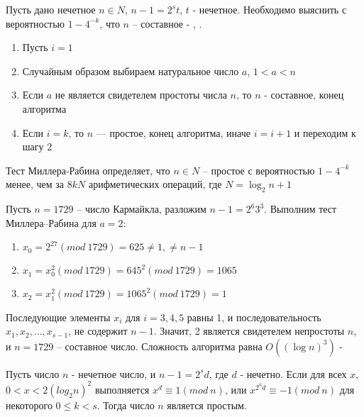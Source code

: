 Пусть дано нечетное {$n \in N$}, {$n - 1 = 2^{ s} t$}, {$t$} - нечетное. Необходимо выяснить 
с вероятностью {$1 - 4^{ -k}$}, что {$n$} – составное - \cite[Глава 1.10, страницы 27-29]{ish11},
\cite[Глава 5.1.3, страницы 183-192]{mah06}.
  
  \begin{enumerate}
   \item Пусть {$i = 1$}
   \item Случайным образом выбираем натуральное число {$a$}, {$1 < a < n$}
   \item Если {$a$} не является свидетелем простоты числа {$n$}, то {$n$} - составное, конец алгоритма
   \item Если {$i = k$}, то {$n$} — простое, конец алгоритма, иначе {$i = i + 1$} и переходим к шагу 2
  \end{enumerate}

  \begin{statement}
      Тест Миллера-Рабина определяет, что {$n \in N$} – простое с вероятностью
    {$1 - 4^{ -k}$} менее, чем за {$ 8kN $} арифметических операций, где {$N = \log_{2}{n} + 1 $}
    
  \end{statement}

  \begin{example}    
  
      Пусть {$n = 1729$} – число Кармайкла, разложим {$n - 1 = 2^{ 6} 3^{ 3}$}. 
    Выполним тест Миллера–Рабина для {$a = 2$}:
    
    \begin{enumerate}
      \item {$x_{0} = 2^{ 27} (mod \: 1729) = 625 \ne 1, \ne n - 1$}
      \item {$x_{1} = x_{0}^{2} (mod \: 1729) = 645^{ 2} (mod \: 1729) = 1065$}
      \item {$x_{2} = x_{1}^{2} (mod \: 1729) = 1065^{ 2} (mod \: 1729) = 1$}
    \end{enumerate}
    
    Последующие элементы {${x_{i}}$} для {$i = 3, 4, 5$} равны 1, и последовательность 
  {${x_{1}, x_{2}, \dots, x_{s-1}}$}, 
  не содержит {$n - 1$}. Значит, 2 является свидетелем непростоты {$n$}, и {$n = 1729$} – составное число. Сложность алгоритма равна $O((\log{n})^3)$ - \cite[Глава 5.1.3, страница 184]{mah06}
  
  \end{example}

  \begin{lemma} \label{eq:prime-big-rabin-theorem}
    Пусть число $n$ - нечетное число, и $n-1 = 2^{s} d$, где $d$ - нечетно. Если для всех $x$, $0 < x < 2(log_{2}{n})^2$
    выполняется $x^d \equiv 1 (mod \: n)$, или $ x^{2^{ k} d} \equiv -1 (mod \: n)$ для некоторого $0 \le k < s$. Тогда число $n$ является простым.
  \end{lemma}

